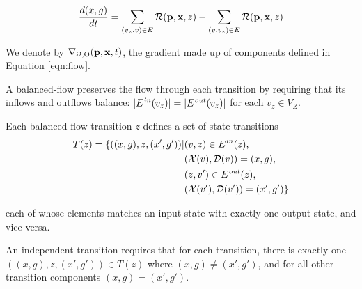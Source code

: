 \begin{definition}
	\begin{equation}\label{eqn:flow}
		\frac{d(x, g)}{dt} = \sum_{(v_z, v) \in E} {\cal R}({\bf p}, {\bf x}, z) - \sum_{(v, v_z)\in E}  {\cal R}({\bf p}, {\bf x}, z)
	\end{equation}





	\noindent We denote
	by $\nabla_{\Omega, \Theta}({\bf p}, {\bf x}, t)$, the gradient made up of components defined in
	Equation \ref{eqn:flow}.
\end{definition}


\begin{definition}
	A balanced-flow \Petrinet{} preserves the flow through each transition by requiring that its inflows and outflows balance: $|E^{\mathit{in}}{}(v_z)| = |E^{\mathit{out}}{}(v_z)|$ for each $v_z \in V_Z$.
\end{definition}

\begin{definition}

	Each balanced-flow \Petrinet{} transition $z$ defines a set of state transitions
	\begin{equation*}
		\begin{split}
			T(z) = \{((x, g), z, (x', g')) | & (v, z) \in E^{\mathit{in}}{}(z),\\
			& ({\cal X}(v),{\cal D}(v)) = (x, g), \\
			& (z, v') \in E^{\mathit{out}}{}(z), \\
			& ({\cal X}(v'),{\cal D}(v')) = (x', g')\}
		\end{split}
	\end{equation*}

	each of whose elements matches an input state with exactly one output state, and vice versa.
\end{definition}


\begin{definition}
	An independent-transition \Petrinet{} requires that for each transition, there
	is exactly one $((x, g), z,
		(x', g')) \in T(z)$ where $(x, g)\not= (x', g')$, and for all other
	transition components $(x, g)= (x', g')$.

\end{definition}

